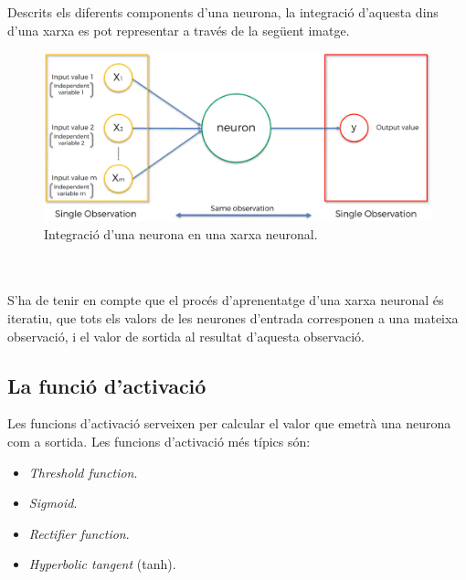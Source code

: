 \documentclass[12pt]{article}
\begin{document}
\\\\Descrits els diferents components d'una neurona, la integració d'aquesta dins d'una xarxa es pot representar a través de la següent imatge.
\pagebreak
\begin{figure}[h!]
	\centering
	\includegraphics[scale=0.3]{imatges/neurona/8completa.png}
	\caption{Integració d'una neurona en una xarxa neuronal.}
\end{figure}
\\\\S'ha de tenir en compte que el procés d'aprenentatge d'una xarxa neuronal és iteratiu, que tots els valors de les neurones d'entrada corresponen a una mateixa observació, i el valor de sortida al resultat d'aquesta observació.



\clearpage
\subsection{La funció d'activació \label{fa}}
Les funcions d'activació serveixen per calcular el valor que emetrà una neurona com a sortida. Les funcions d'activació més típics són:
\begin{itemize}
	\item \textit{Threshold function}.
	\item \textit{Sigmoid}.
	\item \textit{Rectifier function}.
	\item \textit{Hyperbolic tangent} (tanh).
\end{itemize}
\end{document}
